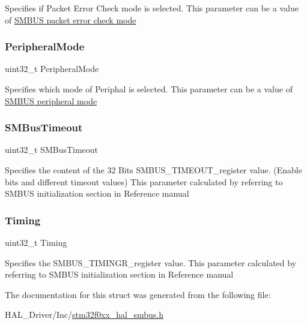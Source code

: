 Specifies if Packet Error Check mode is selected. This parameter can be a value of \hyperlink{group___s_m_b_u_s__packet__error__check__mode}{S\+M\+B\+US packet error check mode} \mbox{\label{struct_s_m_b_u_s___init_type_def_a3fdc14ef0737148ca9f769fc1e42846e}} 
\subsubsection{\texorpdfstring{Peripheral\+Mode}{PeripheralMode}}
{\footnotesize\ttfamily uint32\+\_\+t Peripheral\+Mode}

Specifies which mode of Periphal is selected. This parameter can be a value of \hyperlink{group___s_m_b_u_s__peripheral__mode}{S\+M\+B\+US peripheral mode} \mbox{\label{struct_s_m_b_u_s___init_type_def_a7fda7115824afc18c97a7a2f32886177}} 
\subsubsection{\texorpdfstring{S\+M\+Bus\+Timeout}{SMBusTimeout}}
{\footnotesize\ttfamily uint32\+\_\+t S\+M\+Bus\+Timeout}

Specifies the content of the 32 Bits S\+M\+B\+U\+S\+\_\+\+T\+I\+M\+E\+O\+U\+T\+\_\+register value. (Enable bits and different timeout values) This parameter calculated by referring to S\+M\+B\+US initialization section in Reference manual \mbox{\label{struct_s_m_b_u_s___init_type_def_acd4afe05c37d7924e50f6795641dbd70}} 
\subsubsection{\texorpdfstring{Timing}{Timing}}
{\footnotesize\ttfamily uint32\+\_\+t Timing}

Specifies the S\+M\+B\+U\+S\+\_\+\+T\+I\+M\+I\+N\+G\+R\+\_\+register value. This parameter calculated by referring to S\+M\+B\+US initialization section in Reference manual 

The documentation for this struct was generated from the following file\+:\begin{DoxyCompactItemize}
\item 
H\+A\+L\+\_\+\+Driver/\+Inc/\hyperlink{stm32f0xx__hal__smbus_8h}{stm32f0xx\+\_\+hal\+\_\+smbus.\+h}\end{DoxyCompactItemize}
